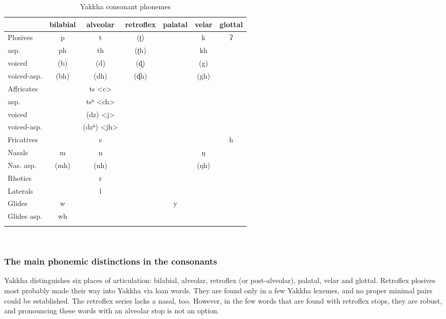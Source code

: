 \begin{table}[htp]
\begin{centering}
{\small
\begin{tabular}{lcccccc}
\lsptoprule
			& {\sc bilabial} &	{\sc alveolar} &	{\sc retroflex }	&	{\sc palatal }&	{\sc velar }&		{\sc glottal}\\
\midrule
{\sc Plosives		}& p   	&	t   	&	(ʈ)  	&			&	k   	& ʔ\\
 {\sc asp.}		& ph   &	th  	&	 (ʈh) 	&			&	kh 		&\\

{\sc voiced}& (b)  	&	(d)   	&	 (ɖ) 	&			&	(g)   	&\\
 {\sc voiced-asp.	}	& (bh)   &	(dh)  	&	  (ɖh)	&			&	(gh) 	&\\

{\sc Affricates 	}&		&	ts <c>		&	  	&		 	&			&	\\
{\sc asp.} 	&		&	tsʰ <ch>		&	 	&	  	&			&\\
{\sc  voiced}	&		&	(dz)	 <j>	&	  	&	 &			&	\\
{\sc voiced-asp.} 	&		&	(dzʰ) <jh>		&	 	&	   	&			&\\

{\sc Fricatives }	&		&	 		s&		&		 	&		 	& h	\\
{\sc Nasals	}	&	m 	&	n		&		&			&		ŋ	&	\\
{\sc Nas. asp.}		&	(mh)	&	(nh)		&		&			&		(ŋh)	&	\\
{\sc Rhotics 	}&		&			r&		 &			&			&	\\
{\sc Laterals	}&		&			l&		 &			&			&  	\\
{\sc Glides 	}	& w		&			&		&y			&		 	&	\\
{\sc Glides asp.} & wh	&			&		&			&			&\\
\lspbottomrule
\end{tabular}\\
}
\caption{Yakkha consonant phonemes}\label{fig-consonants}
\end{centering}
\end{table}


\subsubsection{The main phonemic distinctions in the consonants}


Yakkha distinguishes six places of articulation: bilabial, alveolar, retroflex (or post-alveolar), palatal, velar and glottal. Retroflex plosives most probably made their way into Yakkha via  loan words. They are found only in a few Yakkha lexemes, and no proper minimal pairs could be established. The retroflex series lacks a nasal, too. However, in the few words that are found with retroflex stops, they are robust, and pronouncing these words with an alveolar stop is not an option. 

